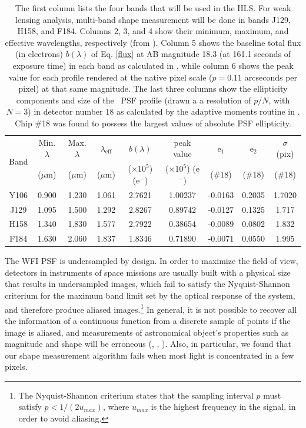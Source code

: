 \documentclass[11pt,preprint,flushrt]{aastex}
\begin{document}
\begin{table}[!htb]
\centering
\begin{tabular}{ |c| c | c| c| c| c| c | c| c|}
\hline
\multirow{2}{*}{Band} & Min. $\lambda$ & Max. $\lambda$ & $\lambda_{\text{eff}}$ & $b(\lambda)$ & peak value  & e$_1$ & e$_2$ & $\sigma$ (pix) \\
& ($\mu$m) & ($\mu$m) & ($\mu$m) & ($\times10^5$) (e$^{-}$) & ($\times 10^{5}$) (e$^{-}$) & (\#18) & (\#18) & (\#18)  \\
\hline 
Y106 & 0.900 & 1.230 & 1.061 & 2.7621 &  1.00237  &-0.0163  & 0.2035 & 1.7020 \\
J129  & 1.095 & 1.500 & 1.292 & 2.8267 &  0.89742 & -0.0127  & 0.1325 & 1.717 \\
H158 & 1.340 & 1.830 & 1.577 & 2.7922 &  0.38654 & -0.0089 & 0.0802 & 1.832 \\
F184 & 1.630 & 2.060 & 1.837 & 1.8346 &  0.71890 & -0.0071 & 0.0550 & 1.995 \\
\hline
\end{tabular}
\caption{The first column lists the four bands that will be used in the HLS. For weak lensing analysis, multi-band shape measurement will be done in bands J129, H158, and F184. Columns 2, 3, and 4 show their minimum, maximum, and effective wavelengths, respectively (from \citealt{kannawadi15}). Column 5 shows the baseline total flux (in electrons) $b(\lambda)$ of Eq. \ref{flux} at AB magnitude 18.3 (at 161.1 seconds of exposure time) in each band as calculated in \gs, while column 6 shows the peak value for each profile rendered at the native pixel scale ($p=0.11$ arcseconds per pixel) at that same magnitude. The last three columns show the ellipticity components and size of the \wfa\ PSF profile (drawn a a resolution of $p/N$, with $N=3$) in detector number 18 as calculated by the adaptive moments routine in \gs. Chip \#18 was found to possess the largest values of absolute PSF ellipticity.}
\label{table1}
\end{table}

The WFI PSF is undersampled by design. In order to maximize the field of view, detectors in instruments of space missions are usually built with a physical size that results in undersampled images, which fail to satisfy the Nyquist-Shannon criterium for the maximum band limit set by the optical response of the system, and therefore produce aliased images.\footnote{The Nyquist-Shannon criterium states that the sampling interval $p$ must satisfy $p < 1/(2 u_{max})$, where $u_{max}$ is the highest frequency in the signal, in order to avoid aliasing.} In general, it is not possible to recover all the information of a continuous function from a discrete sample of points if the image is aliased, and measurements of astronomical object's properties such as magnitude and shape will be erroneous (\citealt{lauer99a}, \citealt{fruchter11}, \citealt{rhodes07}). Also, in particular, we found that our shape measurement algorithm fails when most light is concentrated in a few pixels.
\end{document}
